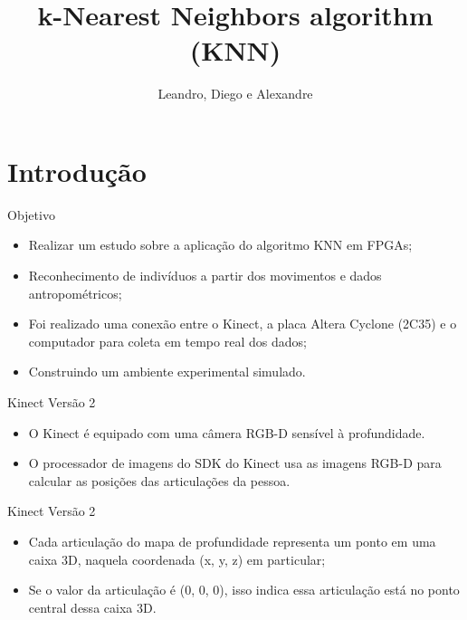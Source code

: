 \documentclass[11pt]{beamer}
\author{Leandro, Diego e Alexandre}
\title{k-Nearest Neighbors algorithm (KNN)}
\begin{document}
\begin{frame}
\titlepage
\end{frame}

\begin{frame}
\tableofcontents
\end{frame}

\section{Introdução}

\begin{frame}{Objetivo}
	\begin{itemize}
	\item Realizar um estudo sobre a aplicação do algoritmo KNN em FPGAs;
	\item Reconhecimento de indivíduos a partir dos movimentos e dados
	antropométricos;
	\item Foi realizado uma conexão entre o Kinect, a placa Altera Cyclone
	(2C35) e o computador para coleta em tempo real dos dados;
	\item Construindo um ambiente experimental simulado. 
	\end{itemize}
\end{frame}

\begin{frame}{Kinect Versão 2}

\begin{itemize}
	\item O Kinect é equipado com uma câmera RGB-D sensível à profundidade.
	\item O processador de imagens do SDK do Kinect usa as imagens RGB-D para
	calcular as posições das articulações da pessoa.
\end{itemize}

\end{frame}

\begin{frame}{Kinect Versão 2}

\begin{itemize}
	\item Cada articulação do mapa de profundidade representa um ponto em uma
	caixa 3D, naquela coordenada (x, y, z) em particular;
	\item Se o valor da articulação é (0, 0, 0), isso indica essa articulação
	está no ponto central dessa caixa 3D.
\end{itemize}

\end{frame}
\end{document}
